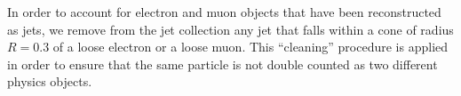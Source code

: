 \par
In order to account for electron and muon objects that
have been reconstructed as jets, we remove from the jet
collection any jet that falls within a
cone of radius $R= 0.3$ of a loose electron or a loose muon. 
This ``cleaning'' procedure is applied in order to ensure that the same
particle is not double counted as two different physics objects.


%
%
%
%
